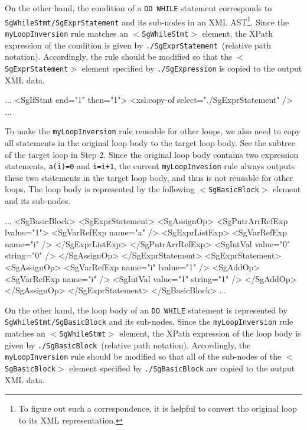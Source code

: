 On the other hand, the condition of a \texttt{DO WHILE} statement
corresponds to \texttt{SgWhileStmt/SgExprStatement} and its sub-nodes in
an XML AST\footnote{To figure out such a correspondence, it is helpful
to convert the original loop to its XML representation.}.  Since the
\texttt{myLoopInversion} rule matches an \texttt{$<$SgWhileStmt$>$}
element, the XPath expression of the condition is given by
\texttt{./SgExprStatement}~(relative path notation). Accordingly, the
rule should be modified so that the \texttt{$<$SgExprStatement$>$}
element specified by \texttt{./SgExpression} is copied to the output XML
data.
\begin{framed}
\begin{src}
...
<SgIfStmt end="1" then="1">
  <xsl:copy-of select="./SgExprStatement" />
...
\end{src}
\end{framed}


To make the \texttt{myLoopInversion} rule reusable for other loops, we
also need to copy all statements in the original loop body to the target
loop body. See the subtree of the target loop in Step 2.  Since the
original loop body contains two expression statements, \texttt{a(i)=0}
and \texttt{i=i+1}, the current \texttt{myLoopInvesion} rule always
outputs these two statements in the target loop body, and thus is not
reusable for other loops. The loop body is represented by the following
\texttt{$<$SgBasicBlock$>$} element and its sub-nodes.
\begin{framed}
\begin{src}
...
<SgBasicBlock>
  <SgExprStatement>
    <SgAssignOp>
      <SgPntrArrRefExp lvalue="1">
	<SgVarRefExp name="a" />
	<SgExprListExp>
	  <SgVarRefExp name="i" />
	</SgExprListExp>
      </SgPntrArrRefExp>
      <SgIntVal value="0" string="0" />
    </SgAssignOp>
  </SgExprStatement>
  <SgExprStatement>
    <SgAssignOp>
      <SgVarRefExp name="i" lvalue="1" />
      <SgAddOp>
	<SgVarRefExp name="i" />
	<SgIntVal value="1" string="1" />
      </SgAddOp>
    </SgAssignOp>
  </SgExprStatement>
</SgBasicBlock>
...
\end{src}
\end{framed}

On the other hand, the loop body of an \texttt{DO WHILE} statement is
represented by \texttt{SgWhileStmt/SgBasicBlock} and its sub-nodes.
Since the \texttt{myLoopInversion} rule matches an
\texttt{$<$SgWhileStmt$>$} element, the XPath expression of the loop
body is given by \texttt{./SgBasicBlock}~(relative path
notation). Accordingly, the \texttt{myLoopInversion} rule should be
modified so that all of the sub-nodes of the \texttt{$<$SgBasicBlock$>$}
element specified by \texttt{./SgBasicBlock} are copied to the output
XML data.

